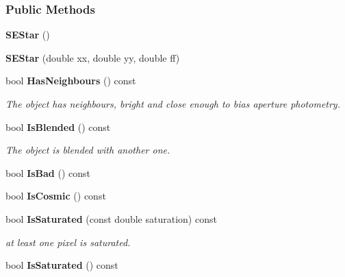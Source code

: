 \subsubsection*{Public Methods}
\begin{CompactItemize}
\item 
{}
{\bf SEStar} ()\label{class_sestar_a0}

\item 
{}
{\bf SEStar} (double xx, double yy, double ff)\label{class_sestar_a1}

\item 
{}
bool {\bf Has\-Neighbours} () const\label{class_sestar_a2}

\begin{CompactList}\small\item\em The object has neighbours, bright and close enough to bias aperture photometry.\item\end{CompactList}\item 
{}
bool {\bf Is\-Blended} () const\label{class_sestar_a3}

\begin{CompactList}\small\item\em The object is blended with another one.\item\end{CompactList}\item 
{}
bool {\bf Is\-Bad} () const\label{class_sestar_a4}

\item 
{}
bool {\bf Is\-Cosmic} () const\label{class_sestar_a5}

\item 
{}
bool {\bf Is\-Saturated} (const double saturation) const\label{class_sestar_a6}

\begin{CompactList}\small\item\em at least one pixel is saturated.\item\end{CompactList}\item 
{}
bool {\bf Is\-Saturated} () const\label{class_sestar_a7}


\end{CompactItemize}
